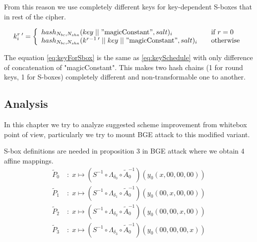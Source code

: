 \documentclass[11pt,oneside,final]{fithesis2}
\begin{document}
    From this reason we use completely different keys for key-dependent S-boxes that in rest of the cipher.

    \begin{equation}\label{eq:keyForSbox}
    k_i^{r \; \prime} = \left\{ 
    \begin{array}{l l} 
	hash_{N_{bc}, N_{sha}}(key\; || \; "\text{magicConstant}", salt)_i                              & \quad \text{if $r=0$}\\
	hash_{N_{bc}, N_{sha}}(k^{r-1 \; \prime} \; || \; key \; || \; "\text{magicConstant}", salt)_i            & \quad \text{otherwise}
    \end{array} \right.
    \end{equation}
    
    The equation \ref{eq:keyForSbox} is the same as \ref{eq:keySchedule} with only difference of concatenation of "magicConstant". This makes 
    two hash chains (1 for round keys, 1 for S-boxes) completely different and non-transformable one to another.
   
    
    \subsection{Analysis}
    In this chapter we try to analyze suggested scheme improvement from whitebox point of view, particularly we try to mount BGE attack to this modified variant. 

    S-box definitions are needed in proposition 3 in BGE attack where we obtain 4 affine mappings.
    \begin{subequations}\label{eq:BGE_prop3}
    \begin{align}
	\widetilde{P}_0 \;&: \; x \mapsto \left( S^{-1} \circ \Lambda_{\delta_0} \circ \widetilde{A}_0^{-1}\right) \left( y_0\left(x, 00, 00, 00\right) \right)\\
	\widetilde{P}_1 \;&: \; x \mapsto \left( S^{-1} \circ \Lambda_{\delta_1} \circ \widetilde{A}_0^{-1}\right) \left( y_0\left(00, x, 00, 00\right) \right)\\
	\widetilde{P}_2 \;&: \; x \mapsto \left( S^{-1} \circ \Lambda_{\delta_2} \circ \widetilde{A}_0^{-1}\right) \left( y_0\left(00, 00, x, 00\right) \right)\\
	\widetilde{P}_3 \;&: \; x \mapsto \left( S^{-1} \circ \Lambda_{\delta_3} \circ \widetilde{A}_0^{-1}\right) \left( y_0\left(00, 00, 00, x\right) \right)
    \end{align}
    \end{subequations}
    
\end{document}

